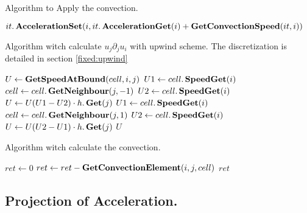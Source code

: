 \begin{algorithm}
\caption{Algorithm to Apply the convection.}
\label{code:ApplyConvection}
\begin{algorithmic}[1]
					\State $it.\mathop{\textbf{AccelerationSet}}(i,it.\mathop{\textbf{AccelerationGet}}(i)+\mathop{\textbf{GetConvectionSpeed}}(it,i))$ 
				\EndIf
			\EndFor
		\EndFor
	\EndFunction
		\end{algorithmic}
\end{algorithm}

\begin{algorithm}
\caption{Algorithm witch calculate $u_{j}\partial_{j}u_{i}$ with upwind scheme. The discretization is detailed in section \ref{fixed:upwind}}
\label{code:GetConvectionElement}
\begin{algorithmic}[1]
		\State $U \gets \mathop{\textbf{GetSpeedAtBound}}(cell,i,j)$
			\State $U1\gets cell.\mathop{\textbf{SpeedGet}}(i)$
			\State $cell \gets cell.\mathop{\textbf{GetNeighbour}}(j,-1)$
			\State $U2 \gets cell.\mathop{\textbf{SpeedGet}}(i)$
			\State $U \gets U(U1-U2)\cdot h.\mathop{\textbf{Get}}(j)$
		\Else
			\State $U1 \gets cell.\mathop{\textbf{SpeedGet}}(i)$
			\State $cell \gets cell.\mathop{\textbf{GetNeighbour}}(j,1)$
			\State $U2\gets cell.\mathop{\textbf{SpeedGet}}(i)$
			\State $U\gets U(U2-U1)\cdot h.\mathop{\textbf{Get}}(j)$
		\EndIf
		\State \Return $U$
\EndFunction
			\end{algorithmic}
\end{algorithm}

\begin{algorithm}
\caption{Algorithm witch calculate the convection.}
\label{code:GetConvectionSpeed}
\begin{algorithmic}[1]
		\State  $ret \gets 0$
			\State $ret\gets ret-\mathop{\textbf{GetConvectionElement}}(i,j,cell)$
		\EndFor
		\State \Return $ret$
	\EndFunction
 \end{algorithmic}
\end{algorithm}


\subsection{Projection of Acceleration.}

